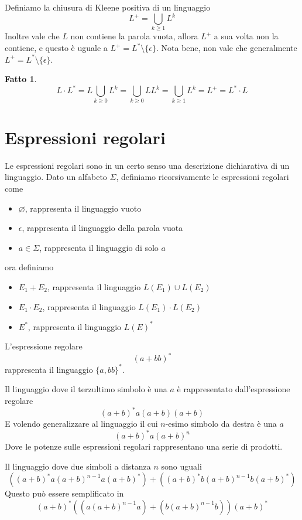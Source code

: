 \documentclass[12pt]{article}
\newtheorem{fatto}{Fatto}
\begin{document}
Definiamo la chiusura di Kleene positiva di un linguaggio
$$ L^+ = \bigcup_{k \geq 1} L^k $$
Inoltre vale che $L$ non contiene la parola vuota, allora $L^+$ a sua volta non la contiene, e questo è uguale a $L^+ = L^* \setminus \{\epsilon\}$.
Nota bene, non vale che generalmente $L^+ = L^* \setminus \{\epsilon\}$.
\begin{fatto}
	$$ L\cdot L^* = L \bigcup_{k \geq 0} L^k = \bigcup_{k \geq 0} L L^k = \bigcup_{k \geq 1} L^k = L^+ = L^* \cdot L $$
\end{fatto}

\section{Espressioni regolari}
Le espressioni regolari sono in un certo senso una descrizione dichiarativa di un linguaggio.
Dato un alfabeto $\Sigma$, definiamo ricorsivamente le espressioni regolari come
\begin{itemize}
	\item $\varnothing$, rappresenta il linguaggio vuoto
	\item $\epsilon$, rappresenta il linguaggio della parola vuota
	\item $a \in \Sigma$, rappresenta il linguaggio di solo $a$
\end{itemize}
ora definiamo
\begin{itemize}
	\item $E_1 + E_2$, rappresenta il linguaggio $L(E_1) \cup L(E_2)$
	\item $E_1 \cdot E_2$, rappresenta il linguaggio $L(E_1) \cdot L(E_2)$
	\item $E^*$, rappresenta il linguaggio $L(E)^*$
\end{itemize}
\begin{tcolorbox}
	L'espressione regolare
	$$ (a + bb)^*$$
	rappresenta il linguaggio $\{a, bb\}^*$.
\end{tcolorbox}
\begin{tcolorbox}
	Il linguaggio dove il terzultimo simbolo è una $a$ è rappresentato dall'espressione regolare
	$$ (a + b)^* a (a + b) (a + b) $$
	E volendo generalizzare al linguaggio il cui $n$-esimo simbolo da destra è una $a$
	$$ (a + b)^* a (a + b)^n $$
	Dove le potenze sulle espressioni regolari rappresentano una serie di prodotti.
\end{tcolorbox}
\begin{tcolorbox}
	Il linguaggio dove due simboli a distanza $n$ sono uguali
	$$ ((a + b)^* a (a + b)^{n - 1} a (a + b)^*) + ((a + b)^* b (a + b)^{n - 1} b (a + b)^*)$$
	Questo può essere semplificato in
	$$ (a + b)^* ((a (a + b)^{n - 1} a) + (b (a + b)^{n - 1} b)) (a + b)^* $$
\end{tcolorbox}
\end{document}
